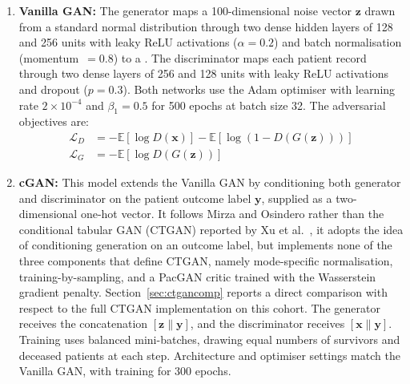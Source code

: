\begin{enumerate}
  \item {\textbf {Vanilla GAN:}} The generator maps a 100-dimensional noise vector $\mathbf{z}$ drawn from a standard normal distribution through two dense hidden layers of 128 and 256 units with leaky ReLU activations ($\alpha = 0.2$) and batch normalisation (momentum~$= 0.8$) to a . The discriminator maps each patient record through two dense layers of 256 and 128 units with leaky ReLU activations and dropout ($p = 0.3$). Both networks use the Adam optimiser with learning rate $2 \times 10^{-4}$ and $\beta_1 = 0.5$ for 500 epochs at batch size 32. The adversarial objectives are:
\begin{align}
\mathcal{L}_D &= -\mathbb{E}[\log D(\mathbf{x})] - \mathbb{E}[\log(1 - D(G(\mathbf{z})))] \\
\mathcal{L}_G &= -\mathbb{E}[\log D(G(\mathbf{z}))]
\end{align}


\item {\textbf {cGAN:}} This model extends the Vanilla GAN by conditioning both generator and discriminator on the patient outcome label $\mathbf{y}$, supplied as a two-dimensional one-hot vector. It follows Mirza and Osindero \cite{mirza2014} rather than the conditional tabular GAN (CTGAN) reported by Xu et al.\ \cite{xu2019},  it adopts the idea of conditioning generation on an outcome label, but implements none of the three components that define CTGAN, namely mode-specific normalisation, training-by-sampling, and a PacGAN critic trained with the Wasserstein gradient penalty. Section~\ref{sec:ctgancomp} reports a direct comparison with respect to the full CTGAN implementation on this cohort. The generator receives the concatenation $[\mathbf{z} \| \mathbf{y}]$, and the discriminator receives $[\mathbf{x} \| \mathbf{y}]$. Training uses balanced mini-batches, drawing equal numbers of survivors and deceased patients at each step. Architecture and optimiser settings match the Vanilla GAN, with training for 300 epochs.


\end{enumerate}
